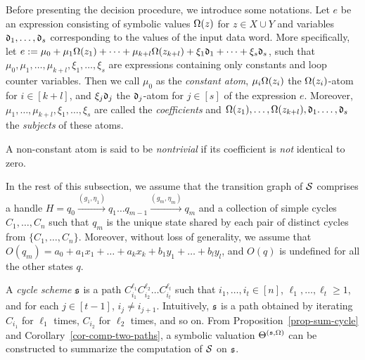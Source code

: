 Before presenting the decision procedure, we introduce some notations.
Let $e$ be an expression consisting of symbolic values $\Omega(z)$ for $z\in X\cup Y$ and variables $\mathfrak{d}_1, \dots, \mathfrak{d}_{s}$ corresponding to the values of the input data word. More specifically, let $e:=\mu_0 + \mu_1 \Omega(z_1) +\dots + \mu_{k+l} \Omega(z_{k+l}) + \xi_1 \mathfrak{d}_1 + \dots + \xi_{s} \mathfrak{d}_{s}$,
such that $\mu_0,\mu_1,\dots,\mu_{k+l}, \xi_1,\dots,\xi_{s}$ are expressions containing only constants and loop counter variables.
Then we call $\mu_0$ as the \emph{constant atom}, $\mu_i \Omega(z_i)$ the $\Omega(z_i)$-atom for $i\in[k+l]$, and $\xi_j \mathfrak{d}_j$ the $\mathfrak{d}_j$-atom for $j\in[s]$ of the expression $e$. Moreover, $\mu_1, \dots, \mu_{k+l}, \xi_1,\dots, \xi_{s}$ are called the \emph{coefficients} and $\Omega(z_1), \dots, \Omega(z_{k+l}), \mathfrak{d}_1. \dots, \mathfrak{d}_{s}$ the \emph{subjects} of these atoms.

A non-constant atom is said to be \emph{nontrivial} if its coefficient is \emph{not} identical to zero.

In the rest of this subsection, we assume that the transition graph of ${\mathcal{S} }$ comprises a handle $H=q_0 \xrightarrow{(g_1,\eta_1)} q_1 \dots q_{m-1} \xrightarrow{(g_m,\eta_m)} q_{m}$ and a collection of simple cycles $C_1,\dots,C_n$ such that $q_m$ is the unique state shared by each pair of distinct cycles from $\{C_1,\dots,C_n\}$. Moreover, without loss of generality, we assume that $O(q_m) = a_0 + a_1 x_1 + \dots + a_k x_k + b_1 y_1 + \dots + b_l y_l$, and $O(q)$ is undefined for all the other states $q$.

A \emph{cycle scheme} ${\mathfrak{s} }$ is a path $C_{i_1}^{\ell_1} C_{i_2}^{\ell_2} \dots C_{i_t}^{\ell_t}$ such that $i_1,\dots,i_t \in [n]$, $\ell_1,\dots, \ell_t \ge 1$, and for each $j\in [t-1]$, $i_j \neq i_{j+1}$. Intuitively, ${\mathfrak{s} }$ is a path obtained by iterating $C_{i_1}$ for $\ell_1$ times, $C_{i_2}$ for $\ell_2$ times, and so on. From Proposition~\ref{prop-sum-cycle} and Corollary~\ref{cor-comp-two-paths}, a symbolic valuation $\Theta^{({\mathfrak{s} },\Omega)}$ can be constructed 
to summarize the computation of ${\mathcal{S} }$ on ${\mathfrak{s} }$. 


